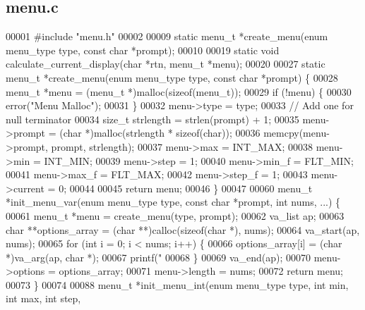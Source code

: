 \subsection{menu.\+c}
\label{menu_8c_source}

\begin{DoxyCode}
00001 \textcolor{preprocessor}{#include "menu.h"}
00002 
00009 \textcolor{keyword}{static} menu_t *create_menu(\textcolor{keyword}{enum} menu_type type, \textcolor{keyword}{const} \textcolor{keywordtype}{char} *prompt);
00010 
00019 \textcolor{keyword}{static} \textcolor{keywordtype}{void} calculate_current_display(\textcolor{keywordtype}{char} *rtn, menu_t *menu);
00020 
00027 \textcolor{keyword}{static} menu_t *create_menu(\textcolor{keyword}{enum} menu_type type, \textcolor{keyword}{const} \textcolor{keywordtype}{char} *prompt) \{
00028   menu_t *menu = (menu_t *)malloc(\textcolor{keyword}{sizeof}(menu_t));
00029   \textcolor{keywordflow}{if} (!menu) \{
00030     error(\textcolor{stringliteral}{"Menu Malloc"});
00031   \}
00032   menu->type = type;
00033   \textcolor{comment}{// Add one for null terminator}
00034   \textcolor{keywordtype}{size\_t} strlength = strlen(prompt) + 1;
00035   menu->prompt = (\textcolor{keywordtype}{char} *)malloc(strlength * \textcolor{keyword}{sizeof}(\textcolor{keywordtype}{char}));
00036   memcpy(menu->prompt, prompt, strlength);
00037   menu->max = INT\_MAX;
00038   menu->min = INT\_MIN;
00039   menu->step = 1;
00040   menu->min_f = FLT\_MIN;
00041   menu->max_f = FLT\_MAX;
00042   menu->step_f = 1;
00043   menu->current = 0;
00044 
00045   \textcolor{keywordflow}{return} menu;
00046 \}
00047 
00060 menu_t *init_menu_var(\textcolor{keyword}{enum} menu_type type, \textcolor{keyword}{const} \textcolor{keywordtype}{char} *prompt, \textcolor{keywordtype}{int} nums, ...) \{
00061   menu_t *menu = create_menu(type, prompt);
00062   va\_list ap;
00063   \textcolor{keywordtype}{char} **options\_array = (\textcolor{keywordtype}{char} **)calloc(\textcolor{keyword}{sizeof}(\textcolor{keywordtype}{char} *), nums);
00064   va\_start(ap, nums);
00065   \textcolor{keywordflow}{for} (\textcolor{keywordtype}{int} i = 0; i < nums; i++) \{
00066     options\_array[i] = (\textcolor{keywordtype}{char} *)va\_arg(ap, \textcolor{keywordtype}{char} *);
00067     printf(\textcolor{stringliteral}{"%
00068   \}
00069   va\_end(ap);
00070   menu->options = options\_array;
00071   menu->length = nums;
00072   \textcolor{keywordflow}{return} menu;
00073 \}
00074 
00088 menu_t *init_menu_int(\textcolor{keyword}{enum} menu_type type, \textcolor{keywordtype}{int} min, \textcolor{keywordtype}{int} max, \textcolor{keywordtype}{int} step,
}
\end{DoxyCode}
